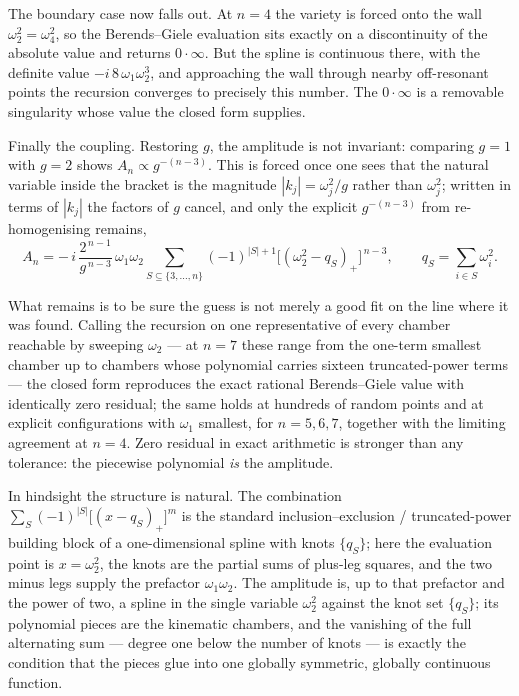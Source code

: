 \documentclass[11pt]{article}
\begin{document}
The boundary case now falls out. At $n=4$ the variety is forced onto the wall
$\omega_2^2=\omega_4^2$, so the Berends--Giele evaluation sits exactly on a discontinuity of the
absolute value and returns $0\cdot\infty$. But the spline is continuous there, with the definite
value $-i\,8\,\omega_1\omega_2^3$, and approaching the wall through nearby off-resonant points the
recursion converges to precisely this number. The $0\cdot\infty$ is a removable singularity whose
value the closed form supplies.

Finally the coupling. Restoring $g$, the amplitude is not invariant: comparing $g=1$ with $g=2$
shows $A_n\propto g^{-(n-3)}$. This is forced once one sees that the natural variable inside the
bracket is the magnitude $|k_j|=\omega_j^2/g$ rather than $\omega_j^2$; written in terms of
$|k_j|$ the factors of $g$ cancel, and only the explicit $g^{-(n-3)}$ from re-homogenising
remains,
\[
\boxed{\;
A_n=-\,i\,\frac{2^{\,n-1}}{g^{\,n-3}}\,\omega_1\omega_2
\sum_{S\subseteq\{3,\dots,n\}}(-1)^{|S|+1}\big[(\omega_2^2-q_S)_+\big]^{\,n-3},
\qquad q_S=\sum_{i\in S}\omega_i^2.
\;}
\]

What remains is to be sure the guess is not merely a good fit on the line where it was found.
Calling the recursion on one representative of every chamber reachable by sweeping $\omega_2$ ---
at $n=7$ these range from the one-term smallest chamber up to chambers whose polynomial carries
sixteen truncated-power terms --- the closed form reproduces the exact rational Berends--Giele
value with identically zero residual; the same holds at hundreds of random points and at explicit
configurations with $\omega_1$ smallest, for $n=5,6,7$, together with the limiting agreement at
$n=4$. Zero residual in exact arithmetic is stronger than any tolerance: the piecewise polynomial
\emph{is} the amplitude.

In hindsight the structure is natural. The combination
$\sum_S(-1)^{|S|}\big[(x-q_S)_+\big]^{m}$ is the standard inclusion--exclusion / truncated-power
building block of a one-dimensional spline with knots $\{q_S\}$; here the evaluation point is
$x=\omega_2^2$, the knots are the partial sums of plus-leg squares, and the two minus legs supply
the prefactor $\omega_1\omega_2$. The amplitude is, up to that prefactor and the power of two, a
spline in the single variable $\omega_2^2$ against the knot set $\{q_S\}$; its polynomial pieces
are the kinematic chambers, and the vanishing of the full alternating sum --- degree one below
the number of knots --- is exactly the condition that the pieces glue into one globally
symmetric, globally continuous function.
\end{document}
